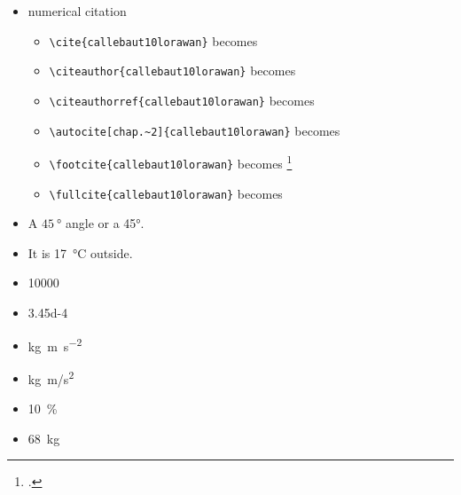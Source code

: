 \begin{itemize}
\begin{itemize}
    \item \verb!\cref{fig:example}! becomes \cref{fig:example}
    \item \verb!\cref{tab:example}! becomes \cref{tab:example}
    \item \verb!\cref{ch:introduction}! becomes \cref{ch:introduction}
    \item \cref{eq:emc2}


\end{itemize}
\item numerical citation~\cite{s19030585}
\begin{itemize}
    \item \verb!\cite{callebaut10lorawan}! becomes \cite{callebaut10lorawan}

    \item \verb!\citeauthor{callebaut10lorawan}! becomes \citeauthor{callebaut10lorawan}
    \item \verb!\citeauthorref{callebaut10lorawan}! becomes 
    \item \verb!\autocite[chap.~2]{callebaut10lorawan}! becomes \autocite[chap.~2]{callebaut10lorawan}
    \item \verb!\footcite{callebaut10lorawan}! becomes \footcite{callebaut10lorawan}
    \item \verb!\fullcite{callebaut10lorawan}! becomes 
\end{itemize}

    \item A $\SI{45}{\degree}$ angle or a \ang{45}.

    \item It is \SI{17}{\degreeCelsius} outside.

    \item  \num{10000}
    \item \num{3.45d-4}

    \item \si{\kilo\gram\meter\per\square\second} 
    \item \si{kg.m/s^2} %

    \item \SI{10}{\percent}
    \item \SI{68}{kg}
\end{itemize}



